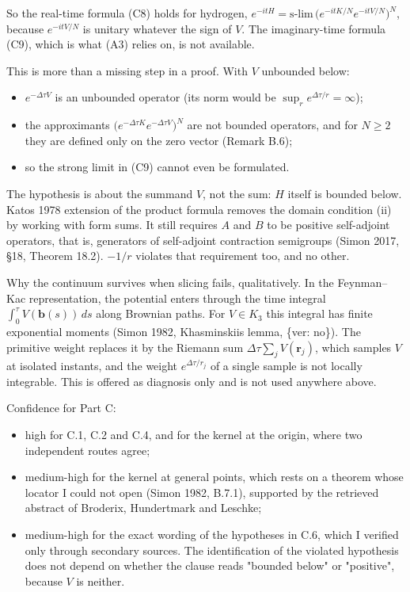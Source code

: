 \documentclass[11pt,a4paper]{article}
\newcommand{\tagmark}[1]{\marginnote{\scriptsize\ttfamily #1}}
\providecommand{\tightlist}{\setlength{\itemsep}{0pt}\setlength{\parskip}{0pt}}
\begin{document}
So the real-time formula (C8) holds for hydrogen, \(e^{-itH}=\text{s-lim}\,\big(e^{-itK/N}e^{-itV/N}\big)^N\), because \(e^{-itV/N}\) is unitary whatever the sign of \(V\). The imaginary-time formula (C9), which is what (A3) relies on, is not available.

This is more than a missing step in a proof. With \(V\) unbounded below:

\begin{itemize}
\tightlist
\item
  \(e^{-\Delta\tau V}\) is an unbounded operator (its norm would be \(\sup_re^{\Delta\tau/r}=\infty\));
\item
  the approximants \(\big(e^{-\Delta\tau K}e^{-\Delta\tau V}\big)^N\) are not bounded operators, and for \(N\ge2\) they are defined only on the zero vector (Remark B.6);
\item
  so the strong limit in (C9) cannot even be formulated.
\end{itemize}

The hypothesis is about the summand \(V\), not the sum: \(H\) itself is bounded below. Kato\textquotesingle s 1978 extension of the product formula removes the domain condition (ii) by working with form sums. It still requires \(A\) and \(B\) to be positive self-adjoint operators, that is, generators of self-adjoint contraction semigroups (Simon 2017, §18, Theorem 18.2). \(-1/r\) violates that requirement too, and no other.

\tagmark{[R]} Why the continuum survives when slicing fails, qualitatively. In the Feynman--Kac representation, the potential enters through the time integral \(\int_0^\tau V(\mathbf b(s))\,ds\) along Brownian paths. For \(V\in K_3\) this integral has finite exponential moments (Simon 1982, Khas\textquotesingle minskii\textquotesingle s lemma, \{ver: no\}). The primitive weight replaces it by the Riemann sum \(\Delta\tau\sum_jV(\mathbf r_j)\), which samples \(V\) at isolated instants, and the weight \(e^{\Delta\tau/r_j}\) of a single sample is not locally integrable. This is offered as diagnosis only and is not used anywhere above.

Confidence for Part C:

\begin{itemize}
\tightlist
\item
  high for C.1, C.2 and C.4, and for the kernel at the origin, where two independent routes agree;
\item
  medium-high for the kernel at general points, which rests on a theorem whose locator I could not open (Simon 1982, B.7.1), supported by the retrieved abstract of Broderix, Hundertmark and Leschke;
\item
  medium-high for the exact wording of the hypotheses in C.6, which I verified only through secondary sources. The identification of the violated hypothesis does not depend on whether the clause reads "bounded below" or "positive", because \(V\) is neither.
\end{itemize}
\end{document}
